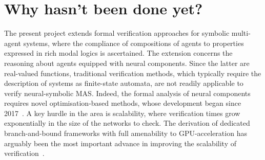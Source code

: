 \documentclass[11pt]{article}
\begin{document}






\section{Why hasn't been done yet?}



The present project extends formal verification approaches
for symbolic multi-agent systems, where the compliance of
compositions of agents to properties expressed in rich modal
logics is ascertained. The extension concerns the reasoning
about agents equipped with neural components. Since the
latter are real-valued functions, traditional verification
methods, which typically require the description of systems
as finite-state automata, are not readily applicable to
verify neural-symbolic MAS. Indeed, the formal analysis of
neural components requires novel optimisation-based methods,
whose development began since 2017~\cite{Katz+17}. A key
hurdle in the area is scalability, where verification times
grow exponentially in the size of the networks to check. The
derivation of dedicated branch-and-bound frameworks with
full amenability to GPU-acceleration has arguably been the
most important advance in improving the scalability of
verification~\cite{Wang+21,FerrariMJV22}. 
\end{document}
